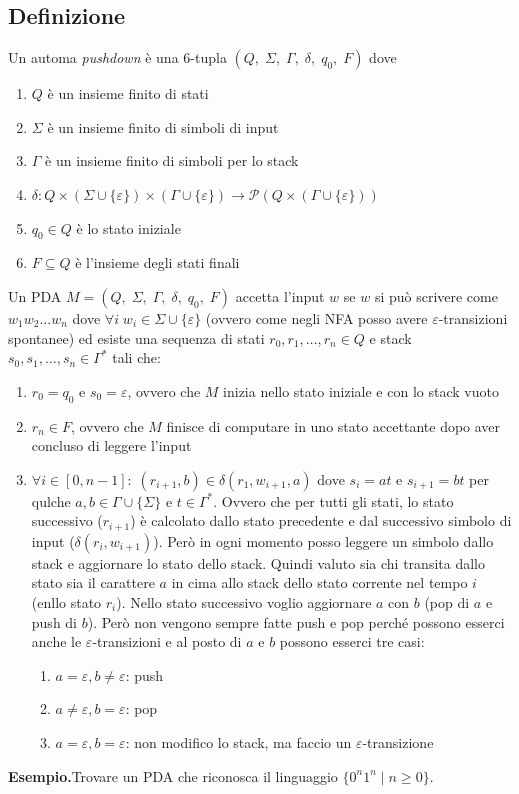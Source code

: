\documentclass[italian]{article}
\newcommand{\powerset}[1]{\mathcal{P}(#1)}
\newcommand{\taleche}{\;|\;}
\newcommand{\example}{\noindent\textbf{Esempio.\quad}}
\begin{document}
\subsection{Definizione}
Un automa \textit{pushdown} è una $6$-tupla $(Q,\;\Sigma,\;\varGamma,\;\delta,\;q_0,\;F)$ dove
\begin{enumerate}
	\item $Q$ è un insieme finito di stati
	\item $\Sigma$ è un insieme finito di simboli di input
	\item $\varGamma$ è un insieme finito di simboli per lo stack
	\item $\delta: Q \times (\Sigma \cup \{\varepsilon\})\times(\varGamma \cup \{ \varepsilon\}) \to \powerset{Q \times (\varGamma \cup \{\varepsilon\})}$
	\item $q_0 \in Q$ è lo stato iniziale
	\item $F \subseteq Q$ è l'insieme degli stati finali
\end{enumerate}
Un PDA $M = (Q,\;\Sigma,\;\varGamma,\;\delta,\;q_0,\;F)$ accetta l'input $w$ se $w$ si può scrivere come $w_1w_2...w_n$ dove $\forall i \; w_i \in \Sigma \cup \{\varepsilon\}$ (ovvero come negli NFA posso avere $\varepsilon$-transizioni spontanee) ed esiste una sequenza di stati $r_0,r_1,\dots,r_n \in Q$ e stack $s_0,s_1,\dots,s_n \in \varGamma^*$ tali che:
\begin{enumerate}
	\item $r_0 = q_0$ e $s_0 = \varepsilon$, ovvero che $M$ inizia nello stato iniziale e con lo stack vuoto
	\item $r_n \in F$, ovvero che $M$ finisce di computare in uno stato accettante dopo aver concluso di leggere l'input
	\item $\forall i \in [0,n-1]:\;(r_{i+1},b) \in \delta(r_1,w_{i+1},a)$ dove $s_i = at$ e $s_{i+1} = bt$ per qulche $a,b \in \varGamma \cup \{\Sigma\}$ e $t \in \varGamma^*$. Ovvero che per tutti gli stati, lo stato successivo ($r_{i+1}$) è calcolato dallo stato precedente e dal successivo simbolo di input ($\delta(r_i,w_{i+1})$). Però in ogni momento posso leggere un simbolo dallo stack e aggiornare lo stato dello stack. Quindi valuto sia chi transita dallo stato sia il carattere $a$ in cima allo stack dello stato corrente nel tempo $i$ (enllo stato $r_i$). Nello stato successivo voglio aggiornare $a$ con $b$ (pop di $a$ e push di $b$). Però non vengono sempre fatte push e pop perché possono esserci anche le $\varepsilon$-transizioni e al posto di $a$ e $b$ possono esserci tre casi:
	\begin{enumerate}
		\item $a=\varepsilon,b \neq \varepsilon$: push
		\item $a\neq\varepsilon,b = \varepsilon$: pop
		\item $a=\varepsilon,b =\varepsilon$: non modifico lo stack, ma faccio un $\varepsilon$-transizione
	\end{enumerate}
\end{enumerate}
\pagebreak
\example Trovare un PDA che riconosca il linguaggio $\{ 0^n1^n \taleche n \geq 0 \}$. \\
\end{document}
